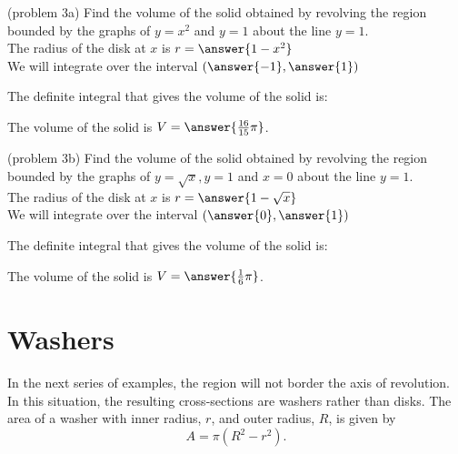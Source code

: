 \documentclass{ximera}
\begin{document}
\begin{problem}(problem 3a)
Find the volume of the solid obtained by revolving the region bounded by the graphs of $y=x^2$ and $y=1$
about the line $y = 1$.\\

The radius of the disk at $x$ is $r = \answer{1-x^2}$\\
We will integrate over the interval $\left(\answer{-1},\answer{1}\right)$

The definite integral that gives the volume of the solid is:\\
\begin{multipleChoice}
\end{multipleChoice}

The volume of the solid is $V = \answer{\frac{16}{15} \pi }$.


\end{problem}


\begin{problem}(problem 3b)
Find the volume of the solid obtained by revolving the region bounded by the graphs of $y=\sqrt x, y=1$ and $x = 0$
about the line $y=1$.\\

The radius of the disk at $x$ is $r = \answer{1-\sqrt x}$\\
We will integrate over the interval $\left(\answer{0},\answer{1}\right)$

The definite integral that gives the volume of the solid is:\\
\begin{multipleChoice}
\end{multipleChoice}

The volume of the solid is $V = \answer{\frac16 \pi }$.

\end{problem}






\section{Washers} In the next series of examples, the region will not border the axis of revolution. 
In this situation, the resulting cross-sections are washers rather than disks.
The area of a washer with inner radius, $r$, and outer radius, $R$, is given by 
\[
A = \pi(R^2 - r^2).
\]
\end{document}
